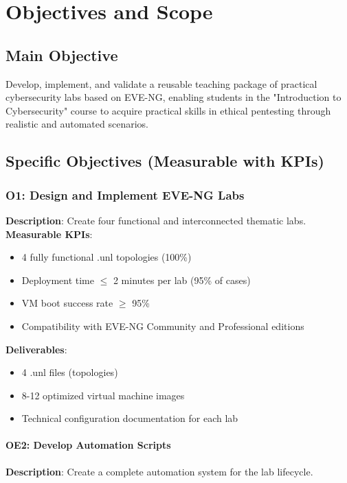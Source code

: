 
\chapter{Objectives and Scope}
\section{Main Objective}

Develop, implement, and validate a reusable teaching package of practical cybersecurity labs based on EVE-NG, enabling students in the "Introduction to Cybersecurity" course to acquire practical skills in ethical pentesting through realistic and automated scenarios.
\section{Specific Objectives (Measurable with KPIs)}

\subsection{O1: Design and Implement EVE-NG Labs}


\textbf{Description}: Create four functional and interconnected thematic labs.
\textbf{Measurable KPIs}:
\begin{itemize}
\item 4 fully functional .unl topologies (100\%)
\item Deployment time $\leq$ 2 minutes per lab (95\% of cases)
\item VM boot success rate $\geq$ 95\%
\item Compatibility with EVE-NG Community and Professional editions
\end{itemize}

\textbf{Deliverables}:
\begin{itemize}
\item 4 .unl files (topologies)
\item 8-12 optimized virtual machine images
\item Technical configuration documentation for each lab
\end{itemize}

\subsubsection{OE2: Develop Automation Scripts}

\textbf{Description}: Create a complete automation system for the lab lifecycle.

